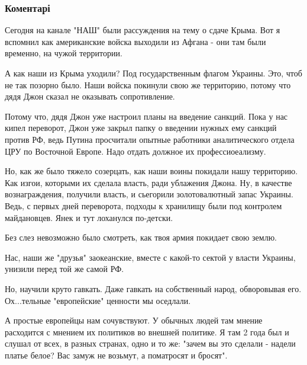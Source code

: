  
 
 
 
 
\subsubsection{Коментарі}
\label{sec:26_10_2021.fb.murajev_jevgenij.1.komedianty_vlast.cmt}

\begin{itemize} %

Сегодня на канале "НАШ" были рассуждения на тему о сдаче Крыма. Вот я вспомнил
как американские войска выходили из Афгана - они там были временно, на чужой
территории.

А как наши из Крыма уходили? Под государственным флагом Украины. Это, чтоб не
так позорно было. Наши войска покинули свою же территорию, потому что дядя Джон
сказал не оказывать сопротивление.

Потому что, дядя Джон уже настроил планы на введение санкций. Пока у нас кипел
переворот, Джон уже закрыл папку о введении нужных ему санкций против РФ, ведь
Путина просчитали опытные работники аналитического отдела ЦРУ по Восточной
Европе. Надо отдать должное их профессиоеализму.

Но, как же было тяжело созерцать, как наши воины покидали нашу территорию. Как
изгои, которыми их сделала власть, ради ублажения Джона. Ну, в качестве
вознаграждения, получили власть, и сьегорили золотовалютный запас Украины.
Ведь, с первых дней переворота, подходы к хранилищу были под контролем
майдановцев. Янек и тут лоханулся по-детски.

Без слез невозможно было смотреть, как твоя армия покидает свою землю.

Нас, наши же "друзья" заокеанские, вместе с какой-то сектой у власти Украины,
унизили перед той же самой РФ.

Но, научили круто гавкать. Даже гавкать на собственный народ, обворовывая его.
Ох...тельные "европейские" ценности мы оседлали.

А простые европейцы нам сочувствуют. У обычных людей там мнение расходится с
мнением их политиков во внешней политике. Я там 2 года был и слушал от всех, в
разных странах, одно и то же: "зачем вы это сделали - надели платье белое? Вас
замуж не возьмут, а поматросят и бросят".


\end{itemize}
